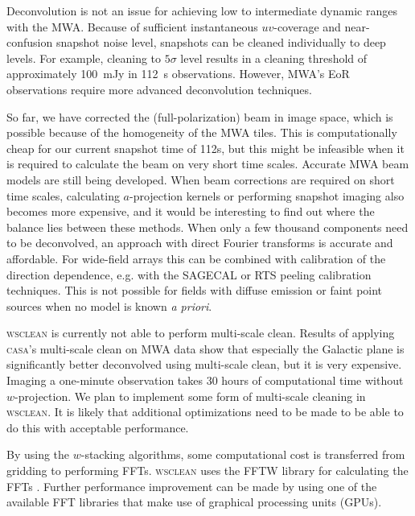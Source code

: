 \documentclass[useAMS,usenatbib]{mn2e}
\begin{document}
Deconvolution is not an issue for achieving low to intermediate dynamic ranges with the MWA. Because of sufficient instantaneous $uv$-coverage and near-confusion snapshot noise level, snapshots can be cleaned individually to deep levels. For example, cleaning to $5\sigma$ level results in a cleaning threshold of approximately 100~mJy in 112~s observations. However, MWA's EoR observations \citep{bowman-science-with-the-mwa-2013} require more advanced deconvolution techniques.

So far, we have corrected the (full-polarization) beam in image space, which is possible because of the homogeneity of the MWA tiles. This is computationally cheap for our current snapshot time of 112s, but this might be infeasible when it is required to calculate the beam on very short time scales. Accurate MWA beam models are still being developed. When beam corrections are required on short time scales, calculating $a$-projection kernels or performing snapshot imaging also becomes more expensive, and it would be interesting to find out where the balance lies between these methods. When only a few thousand components need to be deconvolved, an approach with direct Fourier transforms is accurate and affordable. For wide-field arrays this can be combined with calibration of the direction dependence, e.g. with the SAGECAL \citep{sage-calibration-ii} or RTS peeling \citep{rts-mwa} calibration techniques. This is not possible for fields with diffuse emission or faint point sources when no model is known \textit{a priori}.

\textsc{wsclean} is currently not able to perform multi-scale clean. Results of applying \textsc{casa}'s multi-scale clean on MWA data show that especially the Galactic plane is significantly better deconvolved using multi-scale clean, but it is very expensive. Imaging a one-minute observation takes 30 hours of computational time without $w$-projection. We plan to implement some form of multi-scale cleaning in \textsc{wsclean}. It is likely that additional optimizations need to be made to be able to do this with acceptable performance.

By using the $w$-stacking algorithms, some computational cost is transferred from gridding to performing FFTs. \textsc{wsclean} uses the FFTW library for calculating the FFTs \citep{fftw-2005}. Further performance improvement can be made by using one of the available FFT libraries that make use of graphical processing units (GPUs).
\end{document}
